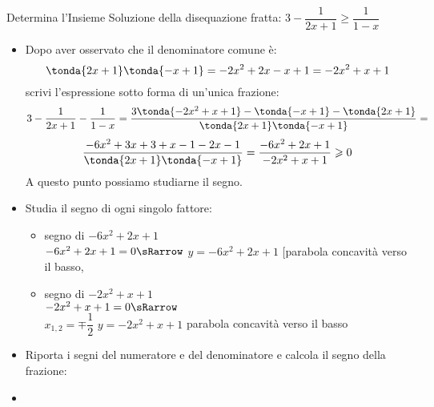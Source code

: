 \begin{esempio}
Determina l'Insieme Soluzione della disequazione fratta:\quad 
\(3-\dfrac{1}{2x+1} \geqslant \dfrac{1}{1-x}\)

\begin{itemize}

\item Dopo aver osservato che il denominatore comune è:
\[\tonda{2x+1}\tonda{-x+1} = -2x^2 +2x -x +1 = -2x^2 +x +1\]
scrivi l'espressione sotto forma di un'unica frazione:
\[3-\dfrac{1}{2x+1} - \dfrac{1}{1-x} =
  \dfrac{3 \tonda{-2x^2 +x +1} - \tonda{-x+1} - \tonda{2x+1}}
        {\tonda{2x+1}\tonda{-x+1}} =\]
\[\dfrac{-6x^2 +3x +3 +x-1 -2x-1}
        {\tonda{2x+1}\tonda{-x+1}} = 
  \dfrac{-6x^2 +2x +1}
        {-2x^2 +x +1} \geqslant 0\]
A questo punto possiamo studiarne il segno.

 \item Studia il segno di ogni singolo fattore:

\begin{itemize}

 \item  segno di \(-6x^2 +2x +1\)\\
 \segnofatt
   {\(-6x^2 +2x +1=0 \sRarrow\)}
   {\(y=-6x^2 +2x +1\)}
   {[parabola concavità verso il basso, }
   {}
 \item segno di \(-2x^2 +x +1\)\\
 \segnofatt
   {\(-2x^2 +x +1=0 \sRarrow \) \\
  \(x_{1,2}=\mp\dfrac{1}{2}\)}
   {\(y=-2x^2 +x +1\)}
   {parabola concavità verso il basso}
   {\parabolaamidma{}{}}
\end{itemize}

 \item Riporta i segni del numeratore e del denominatore e calcola
il segno della frazione:

\begin{inaccessibleblock}
\vspace{2em}
  \begin{center}
  \segnofrazionec
  \end{center}
\end{inaccessibleblock}

 \item 
\end{itemize}
\end{esempio}

% 


